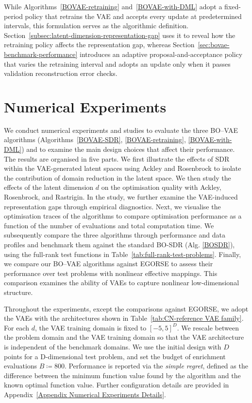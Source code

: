 \documentclass[pdflatex,sn-mathphys-num]{sn-jnl}%
\theoremstyle{thmstyleone}%
\theoremstyle{thmstyletwo}%
\theoremstyle{thmstylethree}%
\begin{document}
While Algorithms~\ref{BOVAE-retraining} and~\ref{BOVAE-with-DML} adopt a fixed-period policy that retrains the VAE and accepts every update at predetermined intervals, this formulation serves as the algorithmic definition. Section~\ref{subsec:latent-dimension-representation-gap} uses it to reveal how the retraining policy affects the representation gap, whereas Section~\ref{sec:bovae-benchmark-performance} introduces an adaptive proposal-and-acceptance policy that varies the retraining interval and adopts an update only when it passes validation reconstruction error checks.

\section{Numerical Experiments}\label{Results}

We conduct numerical experiments and studies to evaluate the three BO--VAE algorithms (Algorithms~\ref{BOVAE-SDR}, \ref{BOVAE-retraining}, \ref{BOVAE-with-DML}) and to examine the main design choices that affect their performance. The results are organised in five parts. We first illustrate the effects of SDR within the VAE-generated latent spaces using Ackley and Rosenbrock to isolate the contribution of domain reduction in the latent space. We then study the effects of the latent dimension $d$ on the optimisation quality with Ackley, Rosenbrock, and Rastrigin. In the study, we further examine the VAE-induced representation gaps through empirical diagnostics. Next, we visualise the optimisation traces of the algorithms to compare optimisation performance as a function of the number of evaluations and total computation time. We subsequently compare the three algorithms through performance and data profiles and benchmark them against the standard BO-SDR (Alg. \ref{BOSDR}), using the full-rank test functions in Table~\ref{tab:full-rank-test-problems}. Finally, we compare our BO--VAE algorithms against EGORSE \cite{egorse} to assess their performance over test problems with nonlinear effective mappings. This comparison examines the ability of VAEs to capture nonlinear low-dimensional structure. 

Throughout the experiments, except the comparisons against EGORSE, we adopt the VAEs with the architectures shown in Table~\ref{tab:CN-reference VAE family}. For each $d$, the VAE training domain is fixed to $[-5, 5]^D$. We rescale between the problem domain and the VAE training domain so that the VAE architecture is independent of the benchmark domains. We use the initial design with $D$ points for a D-dimensional test problem, and set the budget of enrichment evaluations $B \coloneq 800$. Performance is reported via the \emph{simple regret}, defined as the difference between the minimum function value found by the algorithm and the known optimal function value. Further configuration details are provided in Appendix~\ref{Appendix Numerical Experiments Details}.
\end{document}
